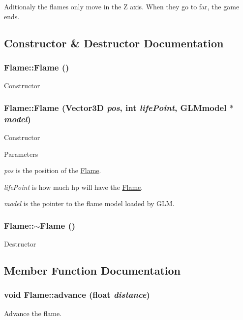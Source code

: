 Aditionaly the flames only move in the Z axis. When they go to far, the game ends. 

\subsection{Constructor \& Destructor Documentation}
\hypertarget{classFlame_a57b7b3fa89daf6286b205747f0d48489}{
\subsubsection[{Flame}]{\setlength{\rightskip}{0pt plus 5cm}Flame::Flame ()}}
\label{classFlame_a57b7b3fa89daf6286b205747f0d48489}
Constructor \hypertarget{classFlame_a05d9240d488266a52af6728bf9b9ea56}{
\subsubsection[{Flame}]{\setlength{\rightskip}{0pt plus 5cm}Flame::Flame ({\bf Vector3D} {\em pos}, \/  int {\em lifePoint}, \/  GLMmodel $\ast$ {\em model})}}
\label{classFlame_a05d9240d488266a52af6728bf9b9ea56}
Constructor


\begin{DoxyParams}{Parameters}
\item[{\em pos}]is the position of the \hyperlink{classFlame}{Flame}. \item[{\em lifePoint}]is how much hp will have the \hyperlink{classFlame}{Flame}. \item[{\em model}]is the pointer to the flame model loaded by GLM. \end{DoxyParams}
\hypertarget{classFlame_ab74ae1bf0b8a3f8315af7cc963149608}{
\subsubsection[{$\sim$Flame}]{\setlength{\rightskip}{0pt plus 5cm}Flame::$\sim$Flame ()}}
\label{classFlame_ab74ae1bf0b8a3f8315af7cc963149608}
Destructor 

\subsection{Member Function Documentation}
\hypertarget{classFlame_ac44ae7ca021b2b49089f87a3625152fa}{
\subsubsection[{advance}]{\setlength{\rightskip}{0pt plus 5cm}void Flame::advance (float {\em distance})}}
\label{classFlame_ac44ae7ca021b2b49089f87a3625152fa}
Advance the flame.


